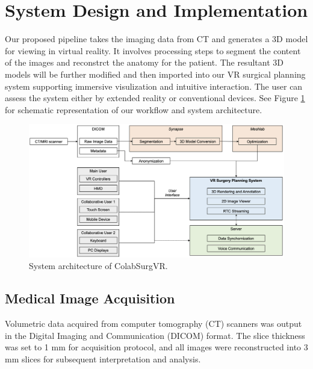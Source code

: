 \documentclass{bmcart}
\begin{document}
\section{System Design and Implementation}
Our proposed pipeline takes the imaging data from CT and generates a 3D model for viewing in virtual reality. It involves processing steps to segment the content of the images and reconstrct the anatomy for the patient. The resultant 3D models will be further modified and then imported into our VR surgical planning system supporting immersive visulization and intuitive interaction. The user can assess the system either by extended reality or conventional devices. See Figure \ref{fig:Scheme} for schematic representation of our workflow and system architecture.



\begin{figure}
  \centering
  \includegraphics[width=.9\linewidth]{../Media/Scheme}  
  \caption{System architecture of ColabSurgVR.}
  \label{fig:Scheme}
\end{figure}

\subsection{Medical Image Acquisition}
Volumetric data acquired from computer tomography (CT) scanners was output in the Digital Imaging and Communication (DICOM) format. The slice thickness was set to 1 mm for acquisition protocol, and all images were reconstructed into 3 mm slices for subsequent interpretation and analysis.
\end{document}
